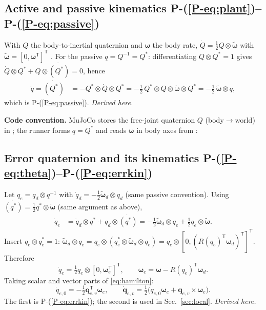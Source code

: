 \documentclass[11pt]{article}
\newcommand{\srcroot}{../../..}
\newcommand{\T}{^{\mathsf T}}
\newcommand{\PE}[1]{P-(\ref{P-#1})}          %
\newcommand{\code}[1]{\texttt{\detokenize{#1}}}
\theoremstyle{remark}
\newcommand{\listing}[4]{%
  }
\begin{document}
\subsection{Active and passive kinematics \PE{eq:plant}--\PE{eq:passive}}
With $Q$ the body-to-inertial quaternion and $\bm\omega$ the body rate, $\dot Q=\tfrac12Q\otimes\tilde{\bm\omega}$ with
$\tilde{\bm\omega}=[0,\bm\omega\T]\T$ \cite{schaub2018amss}. For the passive $q=Q^{-1}=Q^*$:
differentiating $Q\otimes Q^*=1$ gives $\dot Q\otimes Q^*+Q\otimes\dot{(Q^*)}=0$, hence
\begin{align*}
\dot q=\dot{(Q^*)}&=-Q^*\otimes\dot Q\otimes Q^*
=-\tfrac12\,Q^*\otimes Q\otimes\tilde{\bm\omega}\otimes Q^*
=-\tfrac12\,\tilde{\bm\omega}\otimes q,
\end{align*}
which is \PE{eq:passive}. \emph{Derived here.}

\textbf{Code convention.} MuJoCo stores the free-joint quaternion $Q$ (body$\to$world) in \code{qpos};
the runner forms $q=Q^*$ and reads $\bm\omega$ in body axes from \code{qvel}:
\listing{experiments/nengo_nef_replication_2026-08-29/run_mujoco_nef.py}{216}{230}{measurement, optional noise, reference, error, PD, PES target}

\subsection{Error quaternion and its kinematics \PE{eq:theta}--\PE{eq:errkin}}
Let $q_e=q_d\otimes q^{-1}$ with $\dot q_d=-\tfrac12\tilde{\bm\omega}_d\otimes q_d$ (same passive convention).
Using $\dot{(q^*)}=\tfrac12 q^*\otimes\tilde{\bm\omega}$ (same argument as above),
\begin{align*}
\dot q_e&=\dot q_d\otimes q^*+q_d\otimes\dot{(q^*)}
=-\tfrac12\tilde{\bm\omega}_d\otimes q_e+\tfrac12 q_e\otimes\tilde{\bm\omega}.
\end{align*}
Insert $q_e\otimes q_e^*=1$: $\tilde{\bm\omega}_d\otimes q_e=q_e\otimes(q_e^*\otimes\tilde{\bm\omega}_d\otimes q_e)
=q_e\otimes[0,(R(q_e)\T\bm\omega_d)\T]\T$. Therefore
\begin{equation}
\dot q_e=\tfrac12q_e\otimes[0,\bm\omega_e\T]\T,\qquad \bm\omega_e=\bm\omega-R(q_e)\T\bm\omega_d .
\end{equation}
Taking scalar and vector parts of \eqref{eq:hamilton}:
\begin{equation}
\dot q_{e,0}=-\tfrac12\bm q_{e,v}\T\bm\omega_e,\qquad
\dot{\bm q}_{e,v}=\tfrac12\big(q_{e,0}\bm\omega_e+\bm q_{e,v}\times\bm\omega_e\big).
\label{eq:qev_dot}
\end{equation}
The first is \PE{eq:errkin}; the second is used in Sec.~\ref{sec:local}. \emph{Derived here.}
\end{document}
